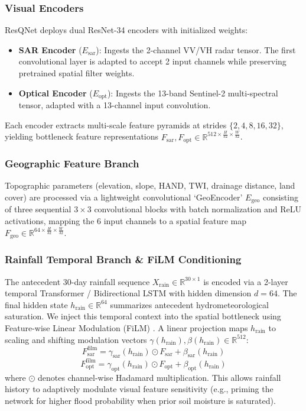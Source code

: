\documentclass[journal]{IEEEtran}
\begin{document}
\subsubsection{Visual Encoders}
ResQNet deploys dual ResNet-34 encoders with initialized weights:
\begin{itemize}
    \item \textbf{SAR Encoder} ($E_{\text{sar}}$): Ingests the 2-channel VV/VH radar tensor. The first convolutional layer is adapted to accept 2 input channels while preserving pretrained spatial filter weights.
    \item \textbf{Optical Encoder} ($E_{\text{opt}}$): Ingests the 13-band Sentinel-2 multi-spectral tensor, adapted with a 13-channel input convolution.
\end{itemize}
Each encoder extracts multi-scale feature pyramids at strides $\{2, 4, 8, 16, 32\}$, yielding bottleneck feature representations $F_{\text{sar}}, F_{\text{opt}} \in \mathbb{R}^{512 \times \frac{H}{32} \times \frac{W}{32}}$.

\subsubsection{Geographic Feature Branch}
Topographic parameters (elevation, slope, HAND, TWI, drainage distance, land cover) are processed via a lightweight convolutional `GeoEncoder' $E_{\text{geo}}$ consisting of three sequential $3 \times 3$ convolutional blocks with batch normalization and ReLU activations, mapping the 6 input channels to a spatial feature map $F_{\text{geo}} \in \mathbb{R}^{64 \times \frac{H}{32} \times \frac{W}{32}}$.

\subsubsection{Rainfall Temporal Branch & FiLM Conditioning}
The antecedent 30-day rainfall sequence $X_{\text{rain}} \in \mathbb{R}^{30 \times 1}$ is encoded via a 2-layer temporal Transformer / Bidirectional LSTM with hidden dimension $d = 64$. The final hidden state $h_{\text{rain}} \in \mathbb{R}^{64}$ summarizes antecedent hydrometeorological saturation. We inject this temporal context into the spatial bottleneck using Feature-wise Linear Modulation (FiLM) \cite{perez2018film}. A linear projection maps $h_{\text{rain}}$ to scaling and shifting modulation vectors $\gamma(h_{\text{rain}}), \beta(h_{\text{rain}}) \in \mathbb{R}^{512}$:
\begin{equation}
F_{\text{sar}}^{\text{film}} = \gamma_{\text{sar}}(h_{\text{rain}}) \odot F_{\text{sar}} + \beta_{\text{sar}}(h_{\text{rain}})
\end{equation}
\begin{equation}
F_{\text{opt}}^{\text{film}} = \gamma_{\text{opt}}(h_{\text{rain}}) \odot F_{\text{opt}} + \beta_{\text{opt}}(h_{\text{rain}})
\end{equation}
where $\odot$ denotes channel-wise Hadamard multiplication. This allows rainfall history to adaptively modulate visual feature sensitivity (e.g., priming the network for higher flood probability when prior soil moisture is saturated).
\end{document}
